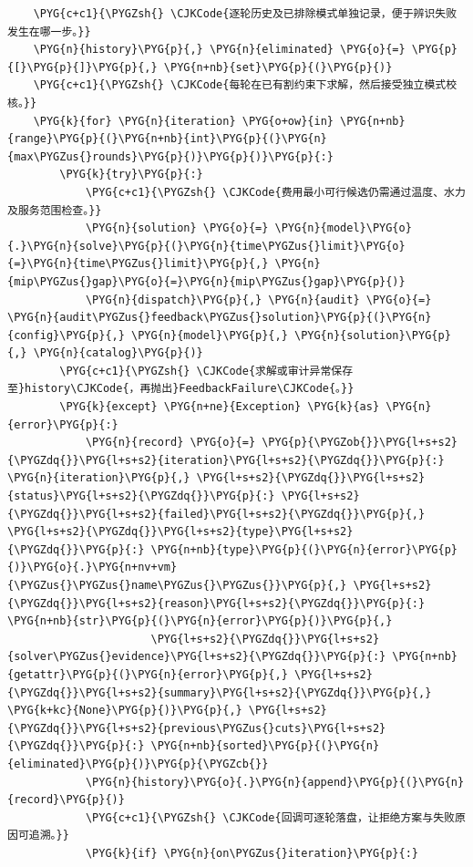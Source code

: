 \begin{Verbatim}
    \PYG{c+c1}{\PYGZsh{} \CJKCode{逐轮历史及已排除模式单独记录，便于辨识失败发生在哪一步。}}
    \PYG{n}{history}\PYG{p}{,} \PYG{n}{eliminated} \PYG{o}{=} \PYG{p}{[}\PYG{p}{]}\PYG{p}{,} \PYG{n+nb}{set}\PYG{p}{(}\PYG{p}{)}
    \PYG{c+c1}{\PYGZsh{} \CJKCode{每轮在已有割约束下求解，然后接受独立模式校核。}}
    \PYG{k}{for} \PYG{n}{iteration} \PYG{o+ow}{in} \PYG{n+nb}{range}\PYG{p}{(}\PYG{n+nb}{int}\PYG{p}{(}\PYG{n}{max\PYGZus{}rounds}\PYG{p}{)}\PYG{p}{)}\PYG{p}{:}
        \PYG{k}{try}\PYG{p}{:}
            \PYG{c+c1}{\PYGZsh{} \CJKCode{费用最小可行候选仍需通过温度、水力及服务范围检查。}}
            \PYG{n}{solution} \PYG{o}{=} \PYG{n}{model}\PYG{o}{.}\PYG{n}{solve}\PYG{p}{(}\PYG{n}{time\PYGZus{}limit}\PYG{o}{=}\PYG{n}{time\PYGZus{}limit}\PYG{p}{,} \PYG{n}{mip\PYGZus{}gap}\PYG{o}{=}\PYG{n}{mip\PYGZus{}gap}\PYG{p}{)}
            \PYG{n}{dispatch}\PYG{p}{,} \PYG{n}{audit} \PYG{o}{=} \PYG{n}{audit\PYGZus{}feedback\PYGZus{}solution}\PYG{p}{(}\PYG{n}{config}\PYG{p}{,} \PYG{n}{model}\PYG{p}{,} \PYG{n}{solution}\PYG{p}{,} \PYG{n}{catalog}\PYG{p}{)}
        \PYG{c+c1}{\PYGZsh{} \CJKCode{求解或审计异常保存至}history\CJKCode{，再抛出}FeedbackFailure\CJKCode{。}}
        \PYG{k}{except} \PYG{n+ne}{Exception} \PYG{k}{as} \PYG{n}{error}\PYG{p}{:}
            \PYG{n}{record} \PYG{o}{=} \PYG{p}{\PYGZob{}}\PYG{l+s+s2}{\PYGZdq{}}\PYG{l+s+s2}{iteration}\PYG{l+s+s2}{\PYGZdq{}}\PYG{p}{:} \PYG{n}{iteration}\PYG{p}{,} \PYG{l+s+s2}{\PYGZdq{}}\PYG{l+s+s2}{status}\PYG{l+s+s2}{\PYGZdq{}}\PYG{p}{:} \PYG{l+s+s2}{\PYGZdq{}}\PYG{l+s+s2}{failed}\PYG{l+s+s2}{\PYGZdq{}}\PYG{p}{,} \PYG{l+s+s2}{\PYGZdq{}}\PYG{l+s+s2}{type}\PYG{l+s+s2}{\PYGZdq{}}\PYG{p}{:} \PYG{n+nb}{type}\PYG{p}{(}\PYG{n}{error}\PYG{p}{)}\PYG{o}{.}\PYG{n+nv+vm}{\PYGZus{}\PYGZus{}name\PYGZus{}\PYGZus{}}\PYG{p}{,} \PYG{l+s+s2}{\PYGZdq{}}\PYG{l+s+s2}{reason}\PYG{l+s+s2}{\PYGZdq{}}\PYG{p}{:} \PYG{n+nb}{str}\PYG{p}{(}\PYG{n}{error}\PYG{p}{)}\PYG{p}{,}
                      \PYG{l+s+s2}{\PYGZdq{}}\PYG{l+s+s2}{solver\PYGZus{}evidence}\PYG{l+s+s2}{\PYGZdq{}}\PYG{p}{:} \PYG{n+nb}{getattr}\PYG{p}{(}\PYG{n}{error}\PYG{p}{,} \PYG{l+s+s2}{\PYGZdq{}}\PYG{l+s+s2}{summary}\PYG{l+s+s2}{\PYGZdq{}}\PYG{p}{,} \PYG{k+kc}{None}\PYG{p}{)}\PYG{p}{,} \PYG{l+s+s2}{\PYGZdq{}}\PYG{l+s+s2}{previous\PYGZus{}cuts}\PYG{l+s+s2}{\PYGZdq{}}\PYG{p}{:} \PYG{n+nb}{sorted}\PYG{p}{(}\PYG{n}{eliminated}\PYG{p}{)}\PYG{p}{\PYGZcb{}}
            \PYG{n}{history}\PYG{o}{.}\PYG{n}{append}\PYG{p}{(}\PYG{n}{record}\PYG{p}{)}
            \PYG{c+c1}{\PYGZsh{} \CJKCode{回调可逐轮落盘，让拒绝方案与失败原因可追溯。}}
            \PYG{k}{if} \PYG{n}{on\PYGZus{}iteration}\PYG{p}{:}

\end{Verbatim}
